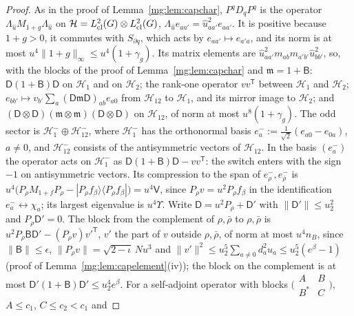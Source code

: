 \documentclass[11pt,a4paper]{article}
\theoremstyle{definition}
\theoremstyle{remark}
\newcommand{\norm}[1]{\lVert #1\rVert}
\begin{document}
\begin{proof}
As in the proof of Lemma~\ref{mg:lem:capchar}, $P^qD_qP^q$ is the operator $\Lambda_{\hat u}M_{1+g}\Lambda_{\hat u}$ on $\mathcal H=L^2_{\rm cl}(G)\otimes L^2_{\rm cl}(G)$,
$\Lambda_{\hat u}e_{aa'}=\hat u_{aa'}^2e_{aa'}$. It is positive because $1+g>0$, it commutes with $S_{\partial q}$, which acts by $e_{aa'}\mapsto e_{a'a}$, and its
norm is at most $u^4\norm{1+g}_\infty\le u^4(1+\gamma_g)$. Its matrix elements are $\hat u_{aa'}^2m_{ab}m_{a'b'}\hat u_{bb'}^2$, so, with the blocks of the
proof of Lemma~\ref{mg:lem:capchar} and $\mathfrak m=1+\mathsf B$: $\mathsf D(1+\mathsf B)\mathsf D$ on $\mathcal H_1$ and on $\mathcal H_2$; the rank-one operator $vv^{\mathsf T}$
between $\mathcal H_1$ and $\mathcal H_2$; $e_{bb'}\mapsto v_{b'}\sum_a(\mathsf D\mathfrak m\mathsf D)_{ab}e_{a0}$ from $\mathcal H_{12}$ to $\mathcal H_1$, and its mirror image to
$\mathcal H_2$; and $(\mathsf D\otimes\mathsf D)(\mathfrak m\otimes\mathfrak m)(\mathsf D\otimes\mathsf D)$ on $\mathcal H_{12}$, of norm at most $u^8(1+\gamma_g)$. The odd sector is
$\mathcal H_1^-\oplus\mathcal H_{12}^-$, where $\mathcal H_1^-$ has the orthonormal basis $e^-_a:=\frac1{\sqrt2}(e_{a0}-e_{0a})$, $a\ne0$, and $\mathcal H_{12}^-$ consists of
the antisymmetric vectors of $\mathcal H_{12}$. In the basis $(e^-_a)$ the operator acts on $\mathcal H_1^-$ as $\mathsf D(1+\mathsf B)\mathsf D-vv^{\mathsf T}$: the switch
enters with the sign $-1$ on antisymmetric vectors. Its compression to the span of $e^-_\rho,e^-_{\bar\rho}$ is $u^4\bigl(P_\rho M_{1+f}P_\rho-|P_\rho f_\beta\rangle\langle P_\rho f_\beta|\bigr)
=u^4\mathsf V$, since $P_\rho v=u^2P_\rho f_\beta$ in the identification $e^-_a\leftrightarrow\chi_a$; its largest eigenvalue is $u^4\Upsilon$. Write $\mathsf D=u^2P_\rho+\mathsf D'$ with
$\norm{\mathsf D'}\le u_2^2$ and $P_\rho\mathsf D'=0$. The block from the complement of $\rho,\bar\rho$ to $\rho,\bar\rho$ is $u^2P_\rho\mathsf B\mathsf D'-(P_\rho v)v'^{\mathsf T}$, $v'$
the part of $v$ outside $\rho,\bar\rho$, of norm at most $u^4n_B$, since $\norm{\mathsf B}\le\epsilon$, $\norm{P_\rho v}=\sqrt{2-\iota}\,Nu^3$ and
$\norm{v'}^2\le u_2^5\sum_{a\ne0}d_a^2u_a\le u_2^5(e^\beta-1)$ (proof of Lemma~\ref{mg:lem:capelement}(iv)); the block on the complement is at most
$\mathsf D'(1+\mathsf B)\mathsf D'\le u_2^4e^\beta$. For a self-adjoint operator with blocks $\bigl(\begin{smallmatrix}A&B\\B^*&C\end{smallmatrix}\bigr)$, $A\le c_1$, $C\le c_2<c_1$ and

\end{proof}
\end{document}
